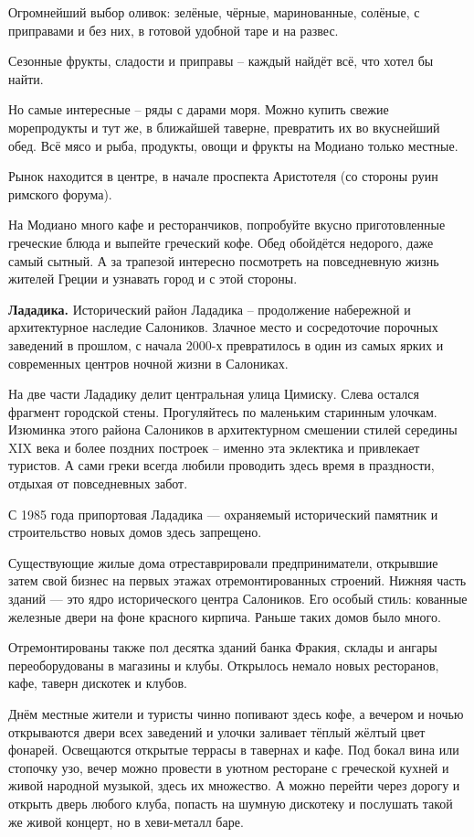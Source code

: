 Огромнейший выбор оливок: зелёные, чёрные, маринованные, солёные, с приправами и без них, в готовой удобной таре и на развес.

Сезонные фрукты, сладости и приправы – каждый найдёт всё, что хотел бы найти.

Но самые интересные – ряды с дарами моря. Можно купить свежие морепродукты и тут же, в ближайшей таверне, превратить их во вкуснейший обед. Всё мясо и рыба, продукты, овощи и фрукты на Модиано только местные.

Рынок находится в центре, в начале проспекта Аристотеля (со стороны руин римского форума).

На Модиано много кафе и ресторанчиков, попробуйте вкусно приготовленные греческие блюда и выпейте греческий кофе. Обед обойдётся недорого, даже самый сытный. А за трапезой интересно посмотреть на повседневную жизнь жителей Греции и узнавать город и с этой стороны.

\textbf{Лададика.}
Исторический район Лададика – продолжение набережной и архитектурное наследие Салоников. Злачное место и сосредоточие порочных заведений в прошлом, с начала 2000-х превратилось в один из самых ярких и современных центров ночной жизни в Салониках.


На две части Лададику делит центральная улица Цимиску. Слева остался фрагмент городской стены. Прогуляйтесь по маленьким старинным улочкам. Изюминка этого района Салоников в архитектурном смешении стилей середины XIX века и более поздних построек – именно эта эклектика и привлекает туристов. А сами греки всегда любили проводить здесь время в праздности, отдыхая от повседневных забот.

С 1985 года припортовая Лададика — охраняемый исторический памятник и строительство новых домов здесь запрещено.

Существующие жилые дома отреставрировали предприниматели, открывшие затем свой бизнес на первых этажах отремонтированных строений. Нижняя часть зданий — это ядро исторического центра Салоников. Его особый стиль: кованные железные двери на фоне красного кирпича. Раньше таких домов было много.

Отремонтированы также пол десятка зданий банка Фракия, склады и ангары переоборудованы в магазины и клубы. Открылось немало новых ресторанов, кафе, таверн дискотек и клубов.

Днём местные жители и туристы чинно попивают здесь кофе, а вечером и ночью открываются двери всех заведений и улочки заливает тёплый жёлтый цвет фонарей. Освещаются открытые террасы в тавернах и кафе. Под бокал вина или стопочку узо, вечер можно провести в уютном ресторане с греческой кухней и живой народной музыкой, здесь их множество. А можно перейти через дорогу и открыть дверь любого клуба, попасть на шумную дискотеку и послушать такой же живой концерт, но в хеви-металл баре.


